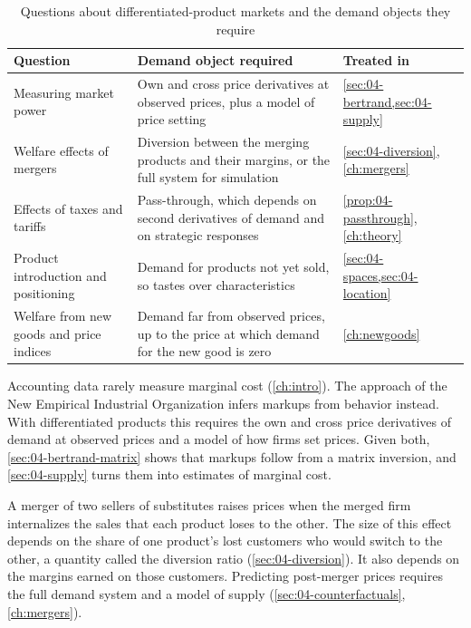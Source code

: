 \begin{table}[htbp]
\centering
\caption{Questions about differentiated-product markets and the demand objects they require}
\label{tab:04-questions}
\footnotesize
\begin{tabularx}{\textwidth}{@{}>{\raggedright\arraybackslash}p{3.3cm}X>{\raggedright\arraybackslash}p{2.6cm}@{}}
\toprule
Question & Demand object required & Treated in \\
\midrule
Measuring market power & Own and cross price derivatives at observed prices, plus a model of price setting
& \cref{sec:04-bertrand,sec:04-supply} \\[2pt]
Welfare effects of mergers & Diversion between the merging products and their margins, or the full system for
simulation & \cref{sec:04-diversion}, \cref{ch:mergers} \\[2pt]
Effects of taxes and tariffs & Pass-through, which depends on second derivatives of demand and on strategic
responses & \cref{prop:04-passthrough}, \cref{ch:theory} \\[2pt]
Product introduction and positioning & Demand for products not yet sold, so tastes over characteristics &
\cref{sec:04-spaces,sec:04-location} \\[2pt]
Welfare from new goods and price indices & Demand far from observed prices, up to the price at which demand for
the new good is zero & \cref{ch:newgoods} \\
\bottomrule
\end{tabularx}
\end{table}

Accounting data rarely measure marginal cost (\cref{ch:intro}). The approach of the New Empirical Industrial
Organization \citep{Bresnahan1989} infers markups from behavior instead. With differentiated products this
requires the own and cross price derivatives of demand at observed prices and a model of how firms set prices.
Given both, \cref{sec:04-bertrand-matrix} shows that markups follow from a matrix inversion, and
\cref{sec:04-supply} turns them into estimates of marginal cost.

A merger of two sellers of substitutes raises prices when the merged firm internalizes the sales that each product
loses to the other. The size of this effect depends on the share of one product's lost customers who would switch
to the other, a quantity called the diversion ratio (\cref{sec:04-diversion}). It also depends on the margins
earned on those customers. Predicting post-merger prices requires the full demand system and a model of supply
(\cref{sec:04-counterfactuals}, \cref{ch:mergers}).

